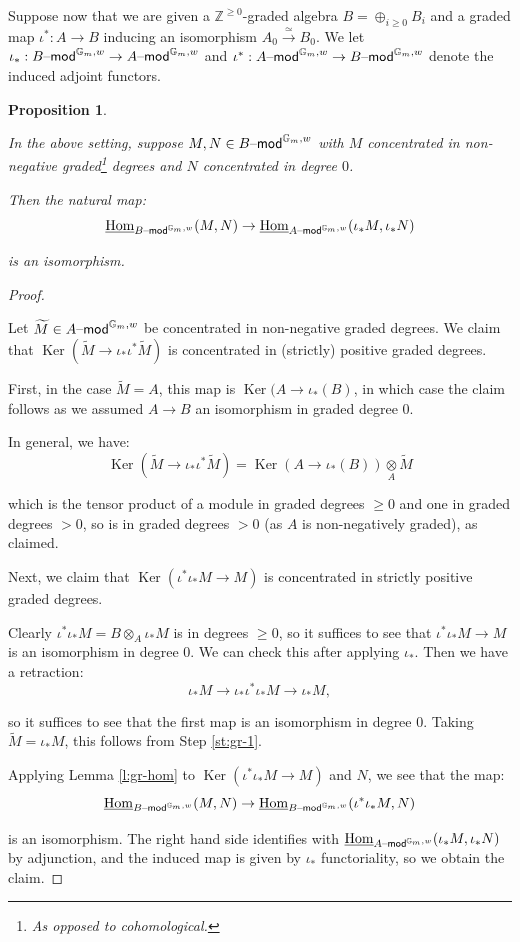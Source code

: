 \documentclass[reqno,11pt]{amsart}
\numberwithin{equation}{subsection}
\newtheorem{prop}[thm]{Proposition}
\theoremstyle{remark}
\newcommand{\xar}[1]{\xrightarrow{#1}}
\newcommand{\rar}[1]{\xar{#1}}
\newcommand{\isom}{\rar{\simeq}}
\newcommand{\bG}{{\mathbb G}}
\newcommand{\bZ}{{\mathbb Z}}
\newcommand{\on}{\operatorname}
\newcommand{\ul}{\underline}
\newcommand{\mathendash}{\text{\textendash}}
\newcommand{\Ker}{\on{Ker}}
\newcommand{\Hom}{\on{Hom}}
\renewcommand{\mod}{\mathendash\mathsf{mod}}
\begin{document}
Suppose now that we are given a $\bZ^{\geq 0}$-graded 
algebra $B = \oplus_{i \geq 0} B_i$ 
and a graded map $\iota^*:A \to B$ inducing
an isomorphism $A_0 \isom B_0$. We let $\iota_*:B\mod^{\bG_m,w} \to A\mod^{\bG_m,w}$
and $\iota^*:A\mod^{\bG_m,w} \to B\mod^{\bG_m,w}$ denote the induced
adjoint functors.

\begin{prop}\label{p:gr-hom}

In the above setting, suppose $M,N \in B\mod^{\bG_m,w}$ with 
$M$ concentrated in non-negative graded\footnote{As opposed to cohomological.} 
degrees and $N$ concentrated in degree $0$. 

Then the natural map:
%
\[
\ul{\Hom}_{B\mod^{\bG_m,w}}(M,N) \to 
\ul{\Hom}_{A\mod^{\bG_m,w}}(\iota_*M,\iota_* N) 
\]

\noindent is an isomorphism.

\end{prop}

\begin{proof}

\step\label{st:gr-1} 

Let $\widetilde{M} \in A\mod^{\bG_m,w}$ be concentrated in non-negative graded degrees.
We claim that $\Ker(\widetilde{M} \to \iota_*\iota^* \widetilde{M})$ is concentrated
in (strictly) positive graded degrees.

First, in the case $\widetilde{M} = A$, this map is $\Ker(A \to \iota_*(B)$, in which case
the claim follows as we assumed $A \to B$ an isomorphism in graded degree $0$.

In general, we have:
%
\[
\Ker(\widetilde{M} \to \iota_*\iota^* \widetilde{M}) = \Ker(A \to \iota_*(B))  \underset{A}{\otimes}
\widetilde{M} 
\]

\noindent which is the tensor product of a module in graded degrees $\geq 0$ and one in graded degrees $>0$, so 
is in graded degrees $>0$ (as $A$ is non-negatively graded), as claimed.

\step\label{st:gr-2}

Next, we claim that $\Ker(\iota^*\iota_* M \to M)$ is concentrated in strictly positive graded degrees.

Clearly $\iota^*\iota_* M = B \otimes_A \iota_* M$ is in degrees $\geq 0$, so it suffices to see that
$\iota^*\iota_* M \to M$ is an isomorphism in degree $0$. We can check this after applying $\iota_*$.
Then we have a retraction:
%
\[
\iota_* M \to \iota_* \iota^*\iota_* M \to \iota_* M,
\]

\noindent so it suffices to see that the first map is an isomorphism in degree $0$.
Taking $\widetilde{M} = \iota_*M$, this follows from Step \ref{st:gr-1}.

\step Applying Lemma \ref{l:gr-hom} to $\Ker(\iota^*\iota_*M \to M)$ and $N$, we see that the map:
%
\[
\ul{\Hom}_{B\mod^{\bG_m,w}}(M,N) \to \ul{\Hom}_{B\mod^{\bG_m,w}}(\iota^*\iota_*M,N) 
\]

\noindent is an isomorphism. The right hand side identifies with $\ul{\Hom}_{A\mod^{\bG_m,w}}(\iota_*M,\iota_*N)$
by adjunction, and the induced map is given by $\iota_*$ functoriality, so we obtain the claim.
 	
\end{proof}
\end{document}
